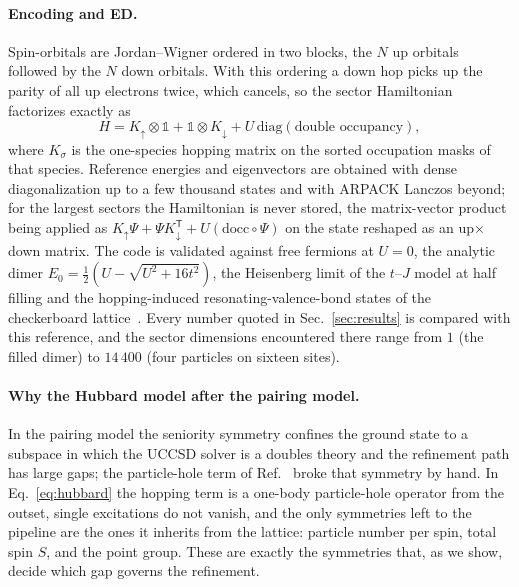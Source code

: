 \documentclass[
  aps,
  prc,
  reprint,
  superscriptaddress,
  floatfix,
  nofootinbib
]{revtex4-2}
\begin{document}
\paragraph{Encoding and ED.}
Spin-orbitals are Jordan--Wigner ordered in two blocks, the $N$ up orbitals
followed by the $N$ down orbitals.  With this ordering a down hop picks up
the parity of all up electrons twice, which cancels, so the sector
Hamiltonian factorizes exactly as
\begin{equation}
  H=K_\uparrow\otimes\mathbb 1+\mathbb 1\otimes K_\downarrow
   +U\,\mathrm{diag}(\text{double occupancy}),
  \label{eq:kron}
\end{equation}
where $K_\sigma$ is the one-species hopping matrix on the sorted occupation
masks of that species.  Reference energies and eigenvectors are obtained
with dense diagonalization up to a few thousand states and with ARPACK
Lanczos beyond; for the largest sectors the Hamiltonian is never stored,
the matrix-vector product being applied as
$K_\uparrow\Psi+\Psi K_\downarrow^{\mathsf T}+U(\mathrm{docc}\circ\Psi)$ on the
state reshaped as an up$\times$down matrix.  The code is validated against
free fermions at $U=0$, the analytic dimer
$E_0=\tfrac12(U-\sqrt{U^2+16t^2})$, the Heisenberg limit of the $t$--$J$
model at half filling and the hopping-induced resonating-valence-bond states
of the checkerboard lattice~\cite{HubbardNotebook}.  Every number quoted in
Sec.~\ref{sec:results} is compared with this reference, and the sector
dimensions encountered there range from $1$ (the filled dimer) to $14\,400$
(four particles on sixteen sites).

\paragraph{Why the Hubbard model after the pairing model.}
In the pairing model the seniority symmetry confines the ground state to a
subspace in which the UCCSD solver is a doubles theory and the refinement
path has large gaps; the particle-hole term of
Ref.~\cite{EigenQPairing2026} broke that symmetry by hand.  In
Eq.~\eqref{eq:hubbard} the hopping term is a one-body particle-hole operator
from the outset, single excitations do not vanish, and the only symmetries
left to the pipeline are the ones it inherits from the lattice: particle
number per spin, total spin $S$, and the point group.  These are exactly the
symmetries that, as we show, decide which gap governs the refinement.

\end{document}

